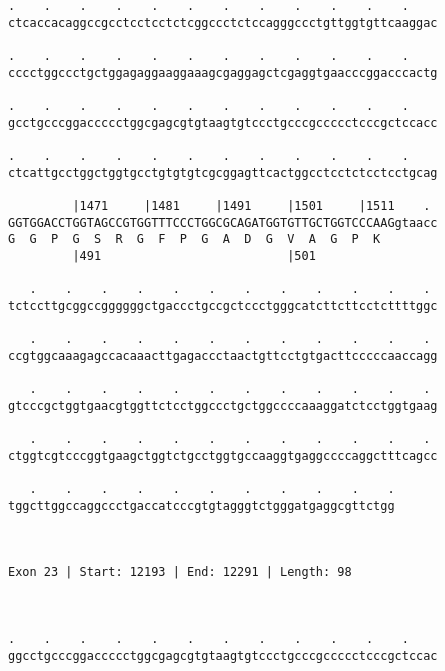 \documentclass{article}
\begin{document}
\begin{Verbatim}
.    .    .    .    .    .    .    .    .    .    .    .    
ctcaccacaggccgcctcctcctctcggccctctccagggccctgttggtgttcaaggac
                                                            
.    .    .    .    .    .    .    .    .    .    .    .    
cccctggccctgctggagaggaaggaaagcgaggagctcgaggtgaacccggacccactg
                                                            
.    .    .    .    .    .    .    .    .    .    .    .    
gcctgcccggaccccctggcgagcgtgtaagtgtccctgcccgccccctcccgctccacc
                                                            
.    .    .    .    .    .    .    .    .    .    .    .    
ctcattgcctggctggtgcctgtgtgtcgcggagttcactggcctcctctcctcctgcag
                                                            
         |1471     |1481     |1491     |1501     |1511    . 
GGTGGACCTGGTAGCCGTGGTTTCCCTGGCGCAGATGGTGTTGCTGGTCCCAAGgtaacc
G  G  P  G  S  R  G  F  P  G  A  D  G  V  A  G  P  K        
         |491                          |501                 
  
   .    .    .    .    .    .    .    .    .    .    .    . 
tctccttgcggccggggggctgaccctgccgctccctgggcatcttcttcctcttttggc
                                                            
   .    .    .    .    .    .    .    .    .    .    .    . 
ccgtggcaaagagccacaaacttgagaccctaactgttcctgtgacttcccccaaccagg
                                                            
   .    .    .    .    .    .    .    .    .    .    .    . 
gtcccgctggtgaacgtggttctcctggccctgctggccccaaaggatctcctggtgaag
                                                            
   .    .    .    .    .    .    .    .    .    .    .    . 
ctggtcgtcccggtgaagctggtctgcctggtgccaaggtgaggccccaggctttcagcc
                                                            
   .    .    .    .    .    .    .    .    .    .    .
tggcttggccaggccctgaccatcccgtgtagggtctgggatgaggcgttctgg
                                                      
                                                      
 
Exon 23 | Start: 12193 | End: 12291 | Length: 98



.    .    .    .    .    .    .    .    .    .    .    .    
ggcctgcccggaccccctggcgagcgtgtaagtgtccctgcccgccccctcccgctccac
                                                            

\end{Verbatim}
\end{document}

